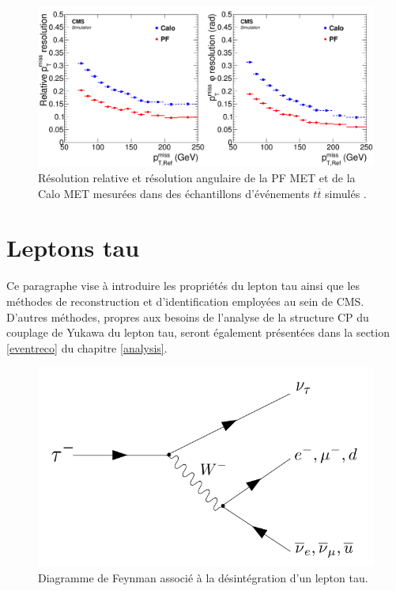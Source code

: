 \begin{figure}
    \centering
    \includegraphics[scale=0.15]{Chapitre4/Images/METres.png}
    \caption{Résolution relative et résolution angulaire de la PF MET et de la Calo MET mesurées dans des échantillons d'événements $t\overline{t}$ simulés \cite{PFalgo}.}
    \label{METreso}
\end{figure}

\section{Leptons tau}

Ce paragraphe vise à introduire les propriétés du lepton tau ainsi que les méthodes de reconstruction et d'identification employées au sein de CMS. D'autres méthodes, propres aux besoins de l'analyse de la structure CP du couplage de Yukawa du lepton tau, seront également présentées dans la section \ref{eventreco} du chapitre \ref{analysis}.

\begin{figure}[b]
\centering
    \includegraphics[width=0.6\linewidth]{Chapitre4/Images/taudecay.png} 
    \caption{Diagramme de Feynman associé à la désintégration d'un lepton tau.}
    \label{taudecay}
\end{figure} 

